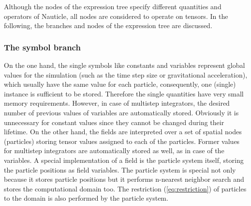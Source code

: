 \documentclass[a4paper,12pt,openany]{book}
\newcommand{\equref}[1]{(\ref{#1})}
\theoremstyle{break}
\begin{document}
Although the nodes of the expression tree specify different quantities and operators of Nauticle, all nodes are considered to operate on tensors. In the following, the branches and nodes of the expression tree are discussed.

\subsubsection{The symbol branch}
On the one hand, the single symbols like constants and variables represent global values for the simulation (such as the time step size or gravitational acceleration), which usually have the same value for each particle, consequently, one (single) instance is sufficient to be stored. Therefore the single quantities have very small memory requirements. However, in case of multistep integrators, the desired number of previous values of variables are automatically stored. Obviously it is unnecessary for constant values since they cannot be changed during their lifetime. On the other hand, the fields are interpreted over a set of spatial nodes (particles) storing tensor values assigned to each of the particles. Former values for multistep integrators are automatically stored as well, as in case of the variables. A special implementation of a field is the particle system itself, storing the particle positions as field variables. The particle system is special not only because it stores particle positions but it performs n-nearest neighbor search and stores the computational domain too. The restriction \equref{eq:restriction} of particles to the domain is also performed by the particle system.
\end{document}
